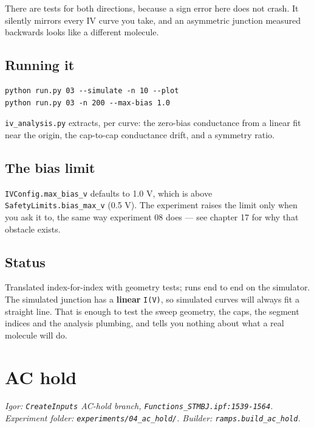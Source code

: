 There are tests for both directions, because a sign error here does not crash. It silently mirrors every IV curve you take, and an asymmetric junction measured backwards looks like a different molecule.

\section{Running it}

\begin{lstlisting}[style=out]
python run.py 03 --simulate -n 10 --plot
python run.py 03 -n 200 --max-bias 1.0
\end{lstlisting}

\texttt{iv\_\discretionary{}{}{}analysis.\discretionary{}{}{}py} extracts, per curve: the zero-bias conductance from a linear fit near the origin, the cap-to-cap conductance drift, and a symmetry ratio.

\section{The bias limit}

\texttt{IVConfig.\discretionary{}{}{}max\_\discretionary{}{}{}bias\_\discretionary{}{}{}v} defaults to 1.0 V, which is above \texttt{Safety\discretionary{}{}{}Limits.\discretionary{}{}{}bias\_\discretionary{}{}{}max\_\discretionary{}{}{}v} (0.5 V). The experiment raises the limit only when you ask it to, the same way experiment 08 does --- see chapter 17 for why that obstacle exists.

\section{Status}

Translated index-for-index with geometry tests; runs end to end on the simulator. The simulated junction has a \textbf{linear} \texttt{I(V)}, so simulated curves will always fit a straight line. That is enough to test the sweep geometry, the caps, the segment indices and the analysis plumbing, and tells you nothing about what a real molecule will do.

\setcounter{chapter}{12}
\chapter{AC hold}

\emph{Igor: \texttt{Create\discretionary{}{}{}Inputs} AC-hold branch, \texttt{Functions\_\discretionary{}{}{}STMBJ.\discretionary{}{}{}ipf:1539-1564}. Experiment folder: \texttt{experiments/\discretionary{}{}{}04\_\discretionary{}{}{}ac\_\discretionary{}{}{}hold/\discretionary{}{}{}}. Builder: \texttt{ramps.\discretionary{}{}{}build\_\discretionary{}{}{}ac\_\discretionary{}{}{}hold}.}

